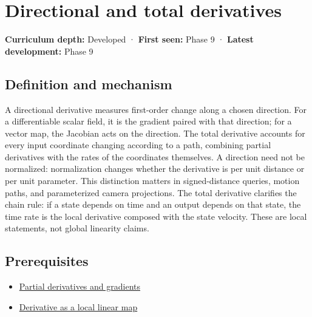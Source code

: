 \hypertarget{appendix-e2d476574aab}{}\label{referencestart:appendix-e2d476574aab}
\section{Directional and total derivatives}\label{appendix-e2d476574aab-directional-and-total-derivatives}

\hypertarget{appendix-e2d476574aab-directional-and-total-derivatives}{}

\textbf{Curriculum depth:} Developed · \textbf{First seen:} Phase 9 · \textbf{Latest development:} Phase 9

\begin{allmightroledefinition}

\subsection{Definition and mechanism}\label{appendix-e2d476574aab-definition-and-mechanism}

\hypertarget{appendix-e2d476574aab-definition-and-mechanism}{}

A directional derivative measures first-order change along a chosen direction. For a differentiable scalar field, it is the gradient paired with that direction; for a vector map, the Jacobian acts on the direction. The total derivative accounts for every input coordinate changing according to a path, combining partial derivatives with the rates of the coordinates themselves. A direction need not be normalized: normalization changes whether the derivative is per unit distance or per unit parameter. This distinction matters in signed-distance queries, motion paths, and parameterized camera projections. The total derivative clarifies the chain rule: if a state depends on time and an output depends on that state, the time rate is the local derivative composed with the state velocity. These are local statements, not global linearity claims.

\end{allmightroledefinition}

\subsection{Prerequisites}\label{appendix-e2d476574aab-prerequisites}

\hypertarget{appendix-e2d476574aab-prerequisites}{}

\begin{itemize}
\tightlist
\item
  \hyperref[appendix-677b59746ae0]{Partial derivatives and gradients}
\item
  \hyperref[appendix-7bc181935c42]{Derivative as a local linear map}
\end{itemize}

